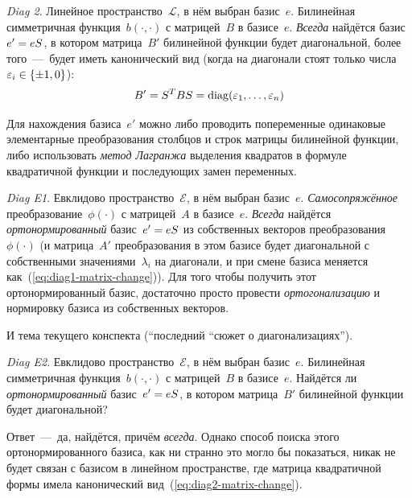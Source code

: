 \documentclass[a4paper,12pt]{article}
\theoremstyle{remark}
\begin{document}
  \emph{Diag 2}.
  Линейное пространство~$\mathcal L$, в нём выбран базис~$e$.
  Билинейная симметричная функция~$b(\cdot, \cdot)$ с матрицей~$B$ в базисе~$e$.
  \emph{Всегда} найдётся базис~$e' \hm= e S$, в котором матрица~$B'$ билинейной функции будет диагональной, более того~---~будет иметь канонический вид (когда на диагонали стоят только числа $\eps_i \hm\in \{\pm 1, 0\}$):
  \begin{equation}\label{eq:diag2-matrix-change}
    B' = S^T B S = \operatorname{diag}(\varepsilon_1, \ldots, \varepsilon_n)
  \end{equation}
  
  Для нахождения базиса~$e'$ можно либо проводить попеременные одинаковые элементарные преобразования столбцов и строк матрицы билинейной функции, либо использовать \emph{метод Лагранжа} выделения квадратов в формуле квадратичной функции и последующих замен переменных.
  
  \smallskip
  
  \emph{Diag E1}.
  Евклидово пространство~$\mathcal E$, в нём выбран базис~$e$.
  \emph{Самосопряжённое} преобразование~$\phi(\cdot)$ с матрицей~$A$ в базисе~$e$.
  \emph{Всегда} найдётся \emph{ортонормированный} базис~$e' \hm= e S$ из собственных векторов преобразования~$\phi(\cdot)$ (и матрица~$A'$ преобразования в этом базисе будет диагональной с собственными значениями~$\lambda_i$ на диагонали, и при смене базиса меняется как~(\ref{eq:diag1-matrix-change})).
  Для того чтобы получить этот ортонормированный базис, достаточно просто провести \emph{ортогонализацию} и нормировку базиса из собственных векторов.
  
  \smallskip
  
  И тема текущего конспекта (``последний ``сюжет о диагонализациях'').
  
  \smallskip
  
  \emph{Diag E2}.
  Евклидово пространство~$\mathcal E$, в нём выбран базис~$e$.
  Билинейная симметричная функция~$b(\cdot, \cdot)$ с матрицей~$B$ в базисе~$e$.
  Найдётся ли \emph{ортонормированный} базис~$e' \hm= e S$, в котором матрица~$B'$ билинейной функции будет диагональной?
  
  Ответ~---~да, найдётся, причём \emph{всегда}.
  Однако способ поиска этого ортонормированного базиса, как ни странно это могло бы показаться, никак не будет связан с базисом в линейном пространстве, где матрица квадратичной формы имела канонический вид~(\ref{eq:diag2-matrix-change}).
  
\end{document}
